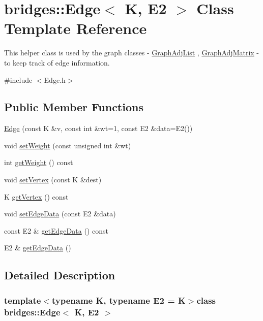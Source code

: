 \hypertarget{classbridges_1_1_edge}{}\section{bridges\+:\+:Edge$<$ K, E2 $>$ Class Template Reference}
\label{classbridges_1_1_edge}


This helper class is used by the graph classes -\/ \hyperlink{classbridges_1_1_graph_adj_list}{Graph\+Adj\+List} , \hyperlink{classbridges_1_1_graph_adj_matrix}{Graph\+Adj\+Matrix} -\/ to keep track of edge information.  




{\ttfamily \#include $<$Edge.\+h$>$}

\subsection*{Public Member Functions}
\begin{DoxyCompactItemize}
\item 
\hyperlink{classbridges_1_1_edge_a8a3fc4ec8164fcff2a7fc057d29db8c7}{Edge} (const K \&v, const int \&wt=1, const E2 \&data=E2())
\item 
void \hyperlink{classbridges_1_1_edge_a7f6a9e983490b32d698de7310ffa28c0}{set\+Weight} (const unsigned int \&wt)
\item 
int \hyperlink{classbridges_1_1_edge_a9984fc2dd50dd236fcab52a9aeec42b3}{get\+Weight} () const 
\item 
void \hyperlink{classbridges_1_1_edge_a6818ee110efa9db2b16323ee443e9ab2}{set\+Vertex} (const K \&dest)
\item 
K \hyperlink{classbridges_1_1_edge_ae001b5a1597068e07fe45d77f959eb8f}{get\+Vertex} () const 
\item 
void \hyperlink{classbridges_1_1_edge_a0f4b37731a5510b46709b095fa6eefb5}{set\+Edge\+Data} (const E2 \&data)
\item 
const E2 \& \hyperlink{classbridges_1_1_edge_a7aec15f1619ebc92742981bc61ae5c05}{get\+Edge\+Data} () const 
\item 
E2 \& \hyperlink{classbridges_1_1_edge_a59ce201560b26ec18a1947a38c82e36f}{get\+Edge\+Data} ()
\end{DoxyCompactItemize}


\subsection{Detailed Description}
\subsubsection*{template$<$typename K, typename E2 = K$>$class bridges\+::\+Edge$<$ K, E2 $>$}

